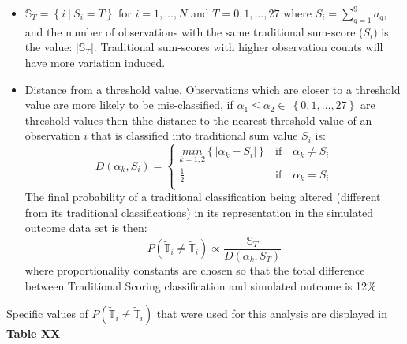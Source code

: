 \documentclass[12pt,]{article}
\providecommand{\tightlist}{%
  \setlength{\itemsep}{0pt}\setlength{\parskip}{0pt}}
\begin{document}
\begin{itemize}
\tightlist
\item
  \(\mathbb{S}_{T}=\left \{ i\ \Big | \ S_{i}=T \right \}\) for
  \(i=1,\ldots, N\) and \(T=0, 1,\ldots, 27\) where
  \(S_{i} = \sum_{q=1}^{9} a_{q}\), and the number of observations with
  the same traditional sum-score (\(S_{i}\)) is the value:
  \(|\mathbb{S}_{T}|\). Traditional sum-scores with higher observation
  counts will have more variation induced.
\item
  Distance from a threshold value. Observations which are closer to a
  threshold value are more likely to be mis-classified, if
  \(\alpha_{1} \leq \alpha_{2} \in \ \left \{ 0,1,\ldots, 27 \right \}\)
  are threshold values then thhe distance to the nearest threshold value
  of an observation \(i\) that is classified into traditional sum value
  \(S_{i}\) is: \[
  D\left(\alpha_{k}, S_{i}   \right)  = 
  \begin{cases}
  \underset{k=1,2}{min}\left \{ \Big | \alpha_{k}-S_{i}   \Big | \right \} &\mbox{if} \quad  \alpha_{k} \neq S_{i} \\ 
  \frac{1}{2} &\mbox{if} \quad  \alpha_{k} = S_{i} \\
  \end{cases}
  \] The final probability of a traditional classification being altered
  (different from its traditional classifications) in its representation
  in the simulated outcome data set is then:
  \[P\left(\tilde{\mathbb{T}}_{i} \neq \tilde{\mathbb{T}}_{i} \right) \propto \frac{|\mathbb{S}_{T}|}{D\left(\alpha_{k}, S_{T} \right) }\]
  where proportionality constants are chosen so that the total
  difference between Traditional Scoring classification and simulated
  outcome is 12\%
\end{itemize}

Specific values of
\(P\left(\tilde{\mathbb{T}}_{i} \neq \tilde{\mathbb{T}}_{i} \right)\)
that were used for this analysis are displayed in \textbf{Table XX}
\end{document}
